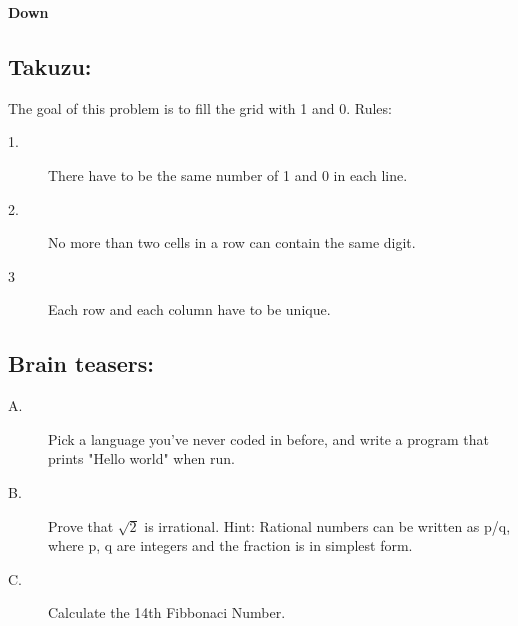 \documentclass{article}
\begin{document}
\begin{PuzzleClues}{\textbf{Down}}
\end{PuzzleClues}

\subsection{Takuzu:}
The goal of this problem is to fill the grid with 1 and 0. 
Rules:
\begin{description}
\item[1.] There have to be the same number of 1 and 0 in each line.
\item[2.] No more than two cells in a row can contain the same digit.
\item[3] Each row and each column have to be unique.
\end{description}


\subsection*{Brain teasers:}
\begin{description}
\item[A.] Pick a language you've never coded in before, and write a program that prints "Hello world" when run.
\item[B.] Prove that $\sqrt{2}$ is irrational.
Hint: Rational numbers can be written as p/q, where p, q are integers and the fraction is in simplest form.
\item[C.] Calculate the 14th Fibbonaci Number.
\end{description}
\end{document}
